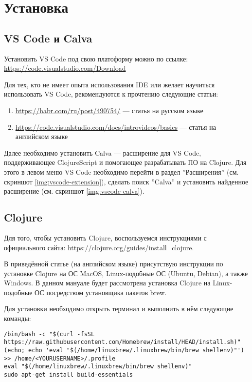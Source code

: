 \chapter*{Установка}

\section*{VS Code и Calva}

Установить VS Code под свою платоформу можно по ссылке: \url{https://code.visualstudio.com/Download}

Для тех, кто не имеет опыта использования IDE или желает научиться использовать VS Code, рекомендуются к прочтению следующие статьи:
\begin{enumerate}[label=\arabic*)]
	\item \url{https://habr.com/ru/post/490754/} --- статья на русском языке
	\item \url{https://code.visualstudio.com/docs/introvideos/basics} --- статья на английском языке
\end{enumerate}

Далее необходимо установить Calva --- расширение для VS Code, поддерживающее ClojureScript и помогающее разрабатывать ПО на Clojure. 
Для этого в левом меню VS Code необходимо перейти в раздел ''Расширения'' (см. скриншот \ref{img:vscode-extension}), сделать поиск ''Calva'' и установить найденное расширение (см. скриншот \ref{img:vscode-calva}).



\section*{Clojure}
Для того, чтобы установить Clojure, воспользуемся инструкциями с официального сайта: \url{https://clojure.org/guides/install_clojure}.

В приведённой статье (на английском языке) присутствую инструкции по установке Clojure на ОС MacOS, Linux-подобные ОС (Ubuntu, Debian), а также Windows. 
В данном мануале будет рассмотрена установка Clojure на Linux-подобные ОС посредством установщика пакетов brew.

Для установки необходимо открыть терминал и выполнить в нём следующие команды:

\begin{center}
	\captionsetup{justification=raggedright,singlelinecheck=off}
	\begin{lstlisting}[label=lst:brew,caption=Установка brew]
/bin/bash -c "$(curl -fsSL https://raw.githubusercontent.com/Homebrew/install/HEAD/install.sh)"
(echo; echo 'eval "$(/home/linuxbrew/.linuxbrew/bin/brew shellenv)"') >> /home/<YOURUSERNAME>/.profile
eval "$(/home/linuxbrew/.linuxbrew/bin/brew shellenv)"
sudo apt-get install build-essentials
	\end{lstlisting}
\end{center}

